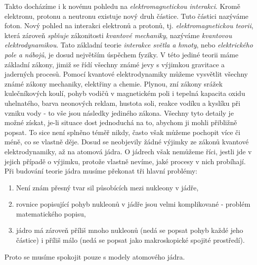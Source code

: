       Takto docházíme i k novému pohledu na \emph{elektromagnetickou interakci}. Kromě elektronu,
      protonu a neutronu existuje nový druh částice. Tuto částici nazýváme foton. Nový pohled na
      interakci elektronů a protonů, tj. \emph{elektromagnetickou teorii}, která zároveň
      \emph{splňuje} zákonitosti \emph{kvantové mechaniky}, nazýváme \emph{kvantovou
      elektrodynamikou}. Tato základní teorie \emph{interakce světla a hmoty}, nebo
      \emph{elektrického pole a nábojů}, je dosud největším úspěchem fyziky. V této jediné teorii
      máme základní zákony, jimiž se řídí všechny známé jevy s výjimkou gravitace a jaderných
      procesů. Pomocí kvantové elektrodynamiky můžeme vysvětlit všechny známé zákony mechaniky,
      elektřiny a chemie. Plynou, zní zákony srážek kulečníkových koulí, pohyb vodičů v magnetickém
      poli i tepelná kapacita oxidu uhelnatého, barva neonových reklam, hustota soli, reakce vodíku
      a kyslíku při vzniku vody - to vše jsou následky jediného zákona. Všechny tyto detaily je
      možné získat, je-li situace dost jednoduchá na to, abychom ji mohli přibližně popsat. To sice
      není splněno téměř nikdy, často však můžeme pochopit více či méně, co se vlastně děje. Dosud
      se neobjevily žádné výjimky ze zákonů kvantové elektrodynamiky, až na atomová jádra. O jádrech
      však nemůžeme říci, jestli jde v jejich případě o výjimku, protože vlastně nevíme, jaké
      procesy v nich probíhají. Při budování teorie jádra musíme překonat tři hlavní problémy:
      \begin{enumerate}[noitemsep]
      \item Není znám přesný tvar sil působících mezi nukleony v jádře,
      \item rovnice popisující pohyb nukleonů v jádře jsou velmi komplikované - problém  
            matematického popisu,
      \item jádro má zároveň příliš mnoho nukleonů (nedá se popsat pohyb každé jeho částice) i    
            příliš málo (nedá se popsat jako makroskopické spojité prostředí).   
      \end{enumerate}
      Proto se musíme spokojit pouze s modely atomového jádra. 
      
